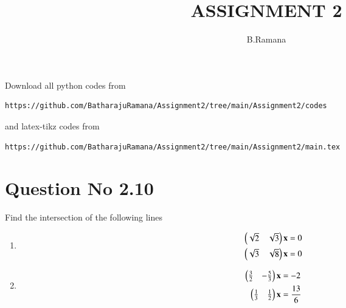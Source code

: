 \documentclass[journal,12pt,twocolumn]{IEEEtran}
\begin{document}
     \def\rightbox#1{\makebox[0in][r]{#1}}
     \def\centbox#1{\makebox[0in]{#1}}
     \def\topbox#1{\raisebox{-\baselineskip}[0in][0in]{#1}}
     \def\midbox#1{\raisebox{-0.5\baselineskip}[0in][0in]{#1}}
\vspace{3cm}
\title{ASSIGNMENT 2}
\author{B.Ramana}
\maketitle
\newpage
\bigskip
\renewcommand{\thefigure}{\theenumi}
\renewcommand{\thetable}{\theenumi}
Download all python codes from 
\begin{lstlisting}
https://github.com/BatharajuRamana/Assignment2/tree/main/Assignment2/codes
\end{lstlisting}
%
and latex-tikz codes from 
%
\begin{lstlisting}
https://github.com/BatharajuRamana/Assignment2/tree/main/Assignment2/main.tex
\end{lstlisting}
%
\section{Question No 2.10}
Find the intersection of the following lines
%
\begin{enumerate}
\item
\begin{align}
\begin{split}
\begin{pmatrix}\sqrt{2} & \sqrt{3} \end{pmatrix}\mathbf{x}&=0
\\
\begin{pmatrix}\sqrt{3} & \sqrt{8} \end{pmatrix}\mathbf{x}&=0 \label{1.0.1}
\end{split}
\end{align}
\item
\begin{align}
\begin{split}
\begin{pmatrix}\frac{3}{2} & -\frac{5}{3} \end{pmatrix}\mathbf{x}&=-2
\\
\begin{pmatrix}\frac{1}{3} & \frac{1}{2}\end{pmatrix}\mathbf{x}&=\frac{13}{6} \label{1.0.2}
\end{split}
\end{align}
\end{enumerate}
%
\end{document}
